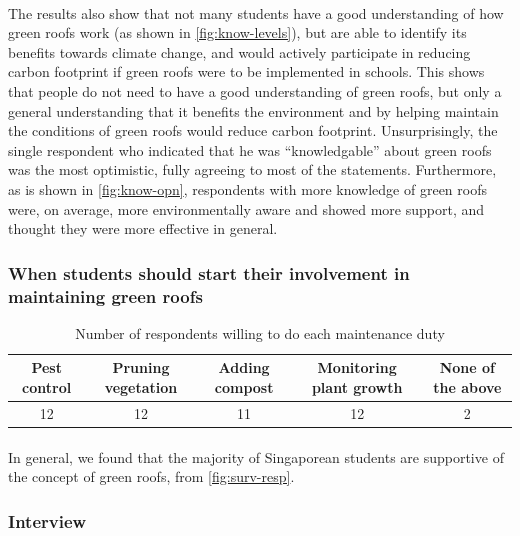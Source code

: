 \documentclass[a4paper]{article}
\begin{document}
\begin{multicols}{2}
  \paragraph{} The results also show that not many students
  have a good understanding of how green roofs work (as shown in
  \cref{fig:know-levels}), but are able to identify its benefits towards
  climate change, and would actively participate in reducing carbon
  footprint if green roofs were to be implemented in schools. This shows
  that people do not need to have a good understanding of green roofs,
  but only a general understanding that it benefits the environment and
  by helping maintain the conditions of green roofs would reduce carbon
  footprint. Unsurprisingly, the single respondent who indicated that
  he was ``knowledgable'' about green roofs was the most optimistic,
  fully agreeing to most of the statements. Furthermore, as is shown in
  \cref{fig:know-opn}, respondents with more knowledge of green roofs
  were, on average, more environmentally aware and showed more support,
  and thought they were more effective in general.

  \subsubsection{
    When students should start their involvement in maintaining green
    roofs
  }

  \begin{table}
    \centering
    \caption{Number of respondents willing to do each maintenance duty}
    \begin{tabular}{|c|c|c|c|c|}
      \hline
      \rowcolor{cyan}
      Pest control & Pruning vegetation  & Adding compost &
      Monitoring plant growth & None of the above \\ \hline
      12 & 12 & 11 & 12 & 2 \\ \hline
    \end{tabular}
    \label{tab:duties}
  \end{table}

  \paragraph{} \label{par:support} In general, we found that the
  majority of Singaporean students are supportive of the concept of
  green roofs, from \cref{fig:surv-resp}.

  \subsubsection{Interview}

\end{multicols}
\end{document}
